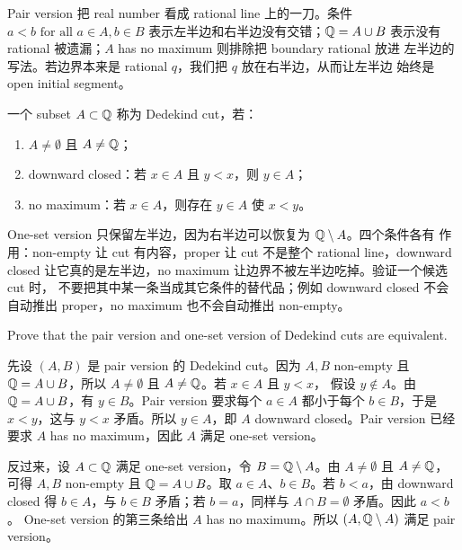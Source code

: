 Pair version 把 real number 看成 rational line 上的一刀。条件
\(a<b\text{ for all }a\in A,b\in B\) 表示左半边和右半边没有交错；\(\mathbb{Q}=A\cup B\)
表示没有 rational 被遗漏；\(A\) has no maximum 则排除把 boundary rational 放进
左半边的写法。若边界本来是 rational \(q\)，我们把 \(q\) 放在右半边，从而让左半边
始终是 open initial segment。

\begin{definition}
一个 subset \(A\subset\mathbb{Q}\) 称为 Dedekind cut，若：
\begin{enumerate}
  \item \(A\ne\emptyset\) 且 \(A\ne\mathbb{Q}\)；
  \item downward closed：若 \(x\in A\) 且 \(y<x\)，则 \(y\in A\)；
  \item no maximum：若 \(x\in A\)，则存在 \(y\in A\) 使 \(x<y\)。
\end{enumerate}
\end{definition}

One-set version 只保留左半边，因为右半边可以恢复为 \(\mathbb{Q}\setminus A\)。四个条件各有
作用：non-empty 让 cut 有内容，proper 让 cut 不是整个 rational line，downward
closed 让它真的是左半边，no maximum 让边界不被左半边吃掉。验证一个候选 cut 时，
不要把其中某一条当成其它条件的替代品；例如 downward closed 不会自动推出
proper，no maximum 也不会自动推出 non-empty。

\begin{exerciseblock}
Prove that the pair version and one-set version of Dedekind cuts are equivalent.
\end{exerciseblock}

\begin{solution}
先设 \((A,B)\) 是 pair version 的 Dedekind cut。因为 \(A,B\) non-empty 且
\(\mathbb{Q}=A\cup B\)，所以 \(A\ne\emptyset\) 且 \(A\ne\mathbb{Q}\)。若 \(x\in A\) 且 \(y<x\)，
假设 \(y\notin A\)。由 \(\mathbb{Q}=A\cup B\)，有 \(y\in B\)。Pair version 要求每个
\(a\in A\) 都小于每个 \(b\in B\)，于是 \(x<y\)，这与 \(y<x\) 矛盾。所以
\(y\in A\)，即 \(A\) downward closed。Pair version 已经要求 \(A\) has no
maximum，因此 \(A\) 满足 one-set version。

反过来，设 \(A\subset\mathbb{Q}\) 满足 one-set version，令 \(B=\mathbb{Q}\setminus A\)。由
\(A\ne\emptyset\) 且 \(A\ne\mathbb{Q}\)，可得 \(A,B\) non-empty 且 \(\mathbb{Q}=A\cup B\)。取
\(a\in A\)、\(b\in B\)。若 \(b<a\)，由 downward closed 得 \(b\in A\)，与
\(b\in B\) 矛盾；若 \(b=a\)，同样与 \(A\cap B=\emptyset\) 矛盾。因此 \(a<b\)。
One-set version 的第三条给出 \(A\) has no maximum。所以 \((A,\mathbb{Q}\setminus A)\)
满足 pair version。
\end{solution}

